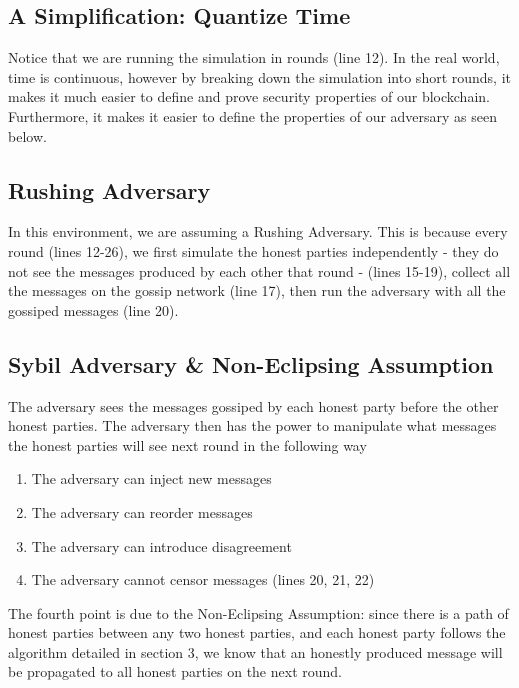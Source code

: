 \subsection{A Simplification: Quantize Time}
Notice that we are running the simulation in rounds (line 12). In the real world, time is continuous, however by breaking down the simulation into short rounds, it makes it much easier to define and prove security properties of our blockchain. Furthermore, it makes it easier to define the properties of our adversary as seen below.

\subsection{Rushing Adversary}
In this environment, we are assuming a Rushing Adversary. This is because every round (lines 12-26), we first simulate the honest parties independently - they do not see the messages produced by each other that round - (lines 15-19), collect all the messages on the gossip network (line 17), then run the adversary with all the gossiped messages (line 20).

\subsection{Sybil Adversary \& Non-Eclipsing Assumption}
The adversary sees the messages gossiped by each honest party before the other honest parties. The adversary then has the power to manipulate what messages the honest parties will see next round in the following way

\begin{enumerate}
    \item The adversary can inject new messages
    \item The adversary can reorder messages
    \item The adversary can introduce disagreement
    \item The adversary cannot censor messages (lines 20, 21, 22)
\end{enumerate}
The fourth point is due to the Non-Eclipsing Assumption: since there is a path of honest parties between any two honest parties, and each honest party follows the algorithm detailed in section 3, we know that an honestly produced message will be propagated to all honest parties on the next round.


